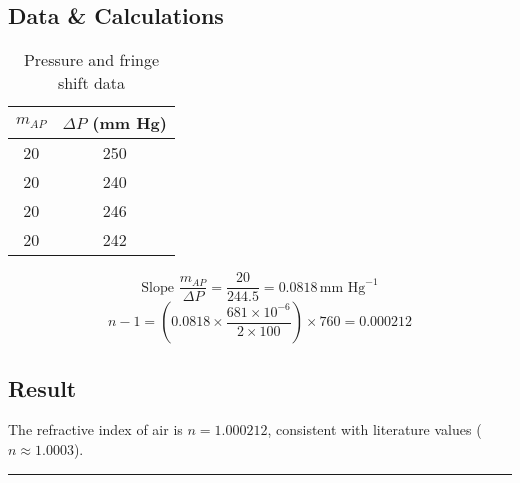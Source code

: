 \documentclass{article}
\begin{document}
\subsection{Data \& Calculations}
\begin{table}[h]
    \centering
    \caption{Pressure and fringe shift data}
    \begin{tabular}{cc}
        \toprule
        \( m_{AP} \) & \( \Delta P \) (mm Hg) \\
        \midrule
        20 & 250 \\
        20 & 240 \\
        20 & 246 \\
        20 & 242 \\
        \bottomrule
    \end{tabular}
\end{table}
\[
\text{Slope } \frac{m_{AP}}{\Delta P} = \frac{20}{244.5} = 0.0818 \, \text{mm Hg}^{-1}
\]
\[
n - 1 = \left( 0.0818 \times \frac{681 \times 10^{-6}}{2 \times 100} \right) \times 760 = 0.000212
\]

\subsection{Result}
The refractive index of air is \( n = \boxed{1.000212} \), consistent with literature values (\( n \approx 1.0003 \)).



\cite{erroranalysis}



\noindent\rule{\linewidth}{0.4pt}
\vspace{3cm}



\end{document}
